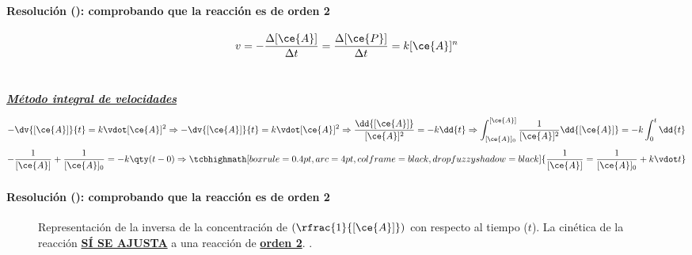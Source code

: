 \begin{frame}
	\frametitle{\ejerciciocmd}
	\framesubtitle{Resolución (): comprobando que la reacción es de orden 2}
	\quad{}
	$$
		v=-\frac{\Delta[\ce{A}]}{\Delta t}=\frac{\Delta[\ce{P}]}{\Delta t}=k[\ce{A}]^n
	$$\\[.4cm]
	\begin{center}
		{\LARGE\textbf{\textit{\underline{Método integral de velocidades}}}}
	\end{center}
	$$
		-\dv{[\ce{A}]}{t}=k\vdot[\ce{A}]^2\Rightarrow
		-\dv{[\ce{A}]}{t}=k\vdot[\ce{A}]^2\Rightarrow\frac{\dd{[\ce{A}]}}{[\ce{A}]^2}=-k\dd{t}\Rightarrow\int_{[\ce{A}]_0}^{[\ce{A}]}\frac{1}{[\ce{A}]^2}\dd{[\ce{A}]}=-k\int_{0}^{t}\dd{t}
	$$
	$$
		-\frac{1}{[\ce{A}]}+\frac{1}{[\ce{A}]_0}=-k\qty(t - 0)\Rightarrow
		\tcbhighmath[boxrule=0.4pt,arc=4pt,colframe=black,drop fuzzy shadow=black]{\frac{1}{[\ce{A}]}=\frac{1}{[\ce{A}]_0}+k\vdot t}
	$$
\end{frame}

\begin{frame}
	\frametitle{\ejerciciocmd}
	\framesubtitle{Resolución (): comprobando que la reacción es de orden 2}
	\begin{center}
		\begin{figure}
			\caption{Representación de la inversa de la concentración de  $\left(\rfrac{1}{[\ce{A}]}\right)$ con respecto al tiempo ($t$). La cinética de la reacción \textbf{\underline{SÍ SE AJUSTA}} a una reacción de \textbf{\underline{orden 2}}. .}
			
		\end{figure}
	\end{center}
\end{frame}

